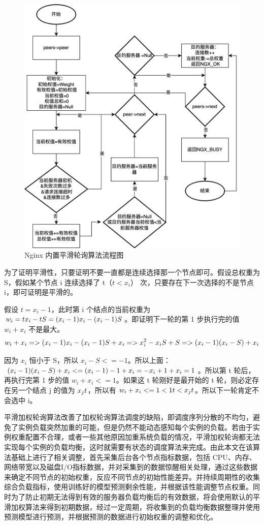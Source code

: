 \begin{figure}[htbp]
  \centering
  \includegraphics[width=.8\textwidth]{figures/smooth_weight.png}
  \caption{Nginx 内置平滑轮询算法流程图}
  \label{pinghualunxun}
\end{figure}

为了证明平滑性，只要证明不要一直都是连续选择那一个节点即可。假设总权重为 S，假如某个节点 i 连续选择了 t（$t < x_i$） 次，只要存在下一次选择的不是节点 i，即可证明是平滑的。

假设 $t = x_i - 1$，此时第 i 个结点的当前权重为 $w_i = t \* x_i - t \* S = (x_i - 1) \* x_i - (x_i - 1) \* S$。即证明下一轮的第 1 步执行完的值 $w_i + x_i$ 不是最大。
\begin{equation}
  w_i + x_i => (x_i - 1) \* x_i - (x_i - 1) \* S + x_i =>x_i^2 - x_i \* S + S => (x_i - 1) \* (x_i - S) + x_i
\end{equation}

因为 $x_i$ 恒小于 S，所以 $x_i - S <= -1$。所以上面：$(x_i - 1) \* (x_i - S) + x_i <= (x_i - 1) \* -1 + x_i = -x_i + 1 + x_i = 1$。所以第 t 轮后，再执行完第 1 步的值 $w_i + x_i <= 1$。如果这 t 轮刚好是最开始的 t 轮，则必定存在另一个结点 j 的值为 $x_j \* t$，所以有 $w_i + x_i <= 1 < 1 \* t < x_j \* t$。所以下一轮肯定不会选中 i。

平滑加权轮询算法改善了加权轮询算法调度的缺陷，即调度序列分散的不均匀，避免了实例负载突然加重的可能，但是仍然不能动态感知每个实例的负载。若由于实例权重配置不合理，或者一些其他原因加重系统负载的情况，平滑加权轮询都无法实现每个实例的负载均衡，这时就需要有状态的调度算法来完成。由此本文在该算法基础上进行了相关调整，首先采集后台各个节点指标数据，包括 CPU、内存、网络带宽以及磁盘I/O指标数据，并对采集到的数据惊醒相关处理，通过这些数据来确定不同节点的初始权重，反应不同节点的初始性能差异。并持续周期性的收集综合负载指标，使用训练好的模型预测剩余性能，并根据该性能调整节点权重。同时为了防止初期无法得到有效的服务器负载均衡后的有效数据，将会使用默认的平滑加权算法来得到初期数据，经过一定周期，将收集到的负载均衡数据整理并使用预测模型进行预测，并根据预测的数据进行初始权重的调整和优化。

